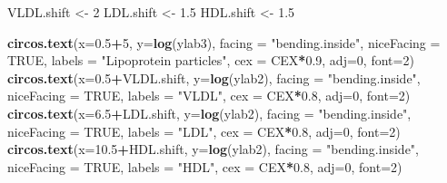\documentclass[
]{article}
\newenvironment{Shaded}{\begin{snugshade}}{\end{snugshade}}
\newcommand{\DataTypeTok}[1]{\textcolor[rgb]{0.13,0.29,0.53}{#1}}
\newcommand{\DecValTok}[1]{\textcolor[rgb]{0.00,0.00,0.81}{#1}}
\newcommand{\FloatTok}[1]{\textcolor[rgb]{0.00,0.00,0.81}{#1}}
\newcommand{\KeywordTok}[1]{\textcolor[rgb]{0.13,0.29,0.53}{\textbf{#1}}}
\newcommand{\NormalTok}[1]{#1}
\newcommand{\OperatorTok}[1]{\textcolor[rgb]{0.81,0.36,0.00}{\textbf{#1}}}
\newcommand{\OtherTok}[1]{\textcolor[rgb]{0.56,0.35,0.01}{#1}}
\newcommand{\StringTok}[1]{\textcolor[rgb]{0.31,0.60,0.02}{#1}}
\begin{document}
\begin{Shaded}
\begin{Highlighting}[]
\NormalTok{VLDL.shift <-}\StringTok{ }\DecValTok{2} 
\NormalTok{LDL.shift <-}\StringTok{ }\FloatTok{1.5}
\NormalTok{HDL.shift <-}\StringTok{ }\FloatTok{1.5}

\KeywordTok{circos.text}\NormalTok{(}\DataTypeTok{x=}\FloatTok{0.5}\OperatorTok{+}\DecValTok{5}\NormalTok{, }\DataTypeTok{y=}\KeywordTok{log}\NormalTok{(ylab3), }\DataTypeTok{facing =} \StringTok{"bending.inside"}\NormalTok{, }\DataTypeTok{niceFacing =} \OtherTok{TRUE}\NormalTok{, }\DataTypeTok{labels =} \StringTok{"Lipoprotein particles"}\NormalTok{, }\DataTypeTok{cex =}\NormalTok{ CEX}\OperatorTok{*}\FloatTok{0.9}\NormalTok{, }\DataTypeTok{adj=}\DecValTok{0}\NormalTok{, }\DataTypeTok{font=}\DecValTok{2}\NormalTok{)}
\KeywordTok{circos.text}\NormalTok{(}\DataTypeTok{x=}\FloatTok{0.5}\OperatorTok{+}\NormalTok{VLDL.shift, }\DataTypeTok{y=}\KeywordTok{log}\NormalTok{(ylab2), }\DataTypeTok{facing =} \StringTok{"bending.inside"}\NormalTok{, }\DataTypeTok{niceFacing =} \OtherTok{TRUE}\NormalTok{, }\DataTypeTok{labels =} \StringTok{"VLDL"}\NormalTok{, }\DataTypeTok{cex =}\NormalTok{ CEX}\OperatorTok{*}\FloatTok{0.8}\NormalTok{, }\DataTypeTok{adj=}\DecValTok{0}\NormalTok{, }\DataTypeTok{font=}\DecValTok{2}\NormalTok{)}
\KeywordTok{circos.text}\NormalTok{(}\DataTypeTok{x=}\FloatTok{6.5}\OperatorTok{+}\NormalTok{LDL.shift, }\DataTypeTok{y=}\KeywordTok{log}\NormalTok{(ylab2), }\DataTypeTok{facing =} \StringTok{"bending.inside"}\NormalTok{, }\DataTypeTok{niceFacing =} \OtherTok{TRUE}\NormalTok{, }\DataTypeTok{labels =} \StringTok{"LDL"}\NormalTok{, }\DataTypeTok{cex =}\NormalTok{ CEX}\OperatorTok{*}\FloatTok{0.8}\NormalTok{, }\DataTypeTok{adj=}\DecValTok{0}\NormalTok{, }\DataTypeTok{font=}\DecValTok{2}\NormalTok{)}
\KeywordTok{circos.text}\NormalTok{(}\DataTypeTok{x=}\FloatTok{10.5}\OperatorTok{+}\NormalTok{HDL.shift, }\DataTypeTok{y=}\KeywordTok{log}\NormalTok{(ylab2), }\DataTypeTok{facing =} \StringTok{"bending.inside"}\NormalTok{, }\DataTypeTok{niceFacing =} \OtherTok{TRUE}\NormalTok{, }\DataTypeTok{labels =} \StringTok{"HDL"}\NormalTok{, }\DataTypeTok{cex =}\NormalTok{ CEX}\OperatorTok{*}\FloatTok{0.8}\NormalTok{, }\DataTypeTok{adj=}\DecValTok{0}\NormalTok{, }\DataTypeTok{font=}\DecValTok{2}\NormalTok{) }


\end{Highlighting}
\end{Shaded}
\end{document}
